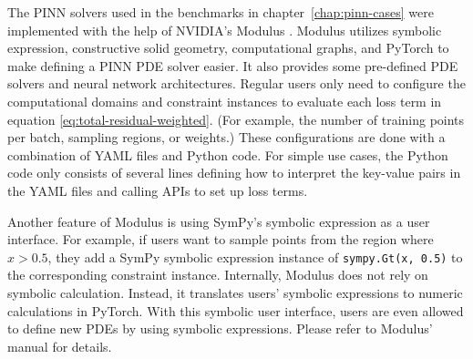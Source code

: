 The PINN solvers used in the benchmarks in chapter~\ref{chap:pinn-cases} were implemented with the help of NVIDIA's Modulus \cite{noauthor_modulus_nodate}.
Modulus utilizes symbolic expression, constructive solid geometry, computational graphs, and PyTorch to make defining a PINN PDE solver easier.
It also provides some pre-defined PDE solvers and neural network architectures.
Regular users only need to configure the computational domains and constraint instances to evaluate each loss term in equation \eqref{eq:total-residual-weighted}.
(For example, the number of training points per batch, sampling regions, or weights.)
These configurations are done with a combination of YAML files and Python code.
For simple use cases, the Python code only consists of several lines defining how to interpret the key-value pairs in the YAML files and calling APIs to set up loss terms.

Another feature of Modulus is using SymPy's symbolic expression \cite{meurer_sympy_2017} as a user interface.
For example, if users want to sample points from the region where $x > 0.5$, they add a SymPy symbolic expression instance of \lstinline{sympy.Gt(x, 0.5)} to the corresponding constraint instance.
Internally, Modulus does not rely on symbolic calculation.
Instead, it translates users' symbolic expressions to numeric calculations in PyTorch.
With this symbolic user interface, users are even allowed to define new PDEs by using symbolic expressions.
Please refer to Modulus' manual for details.

